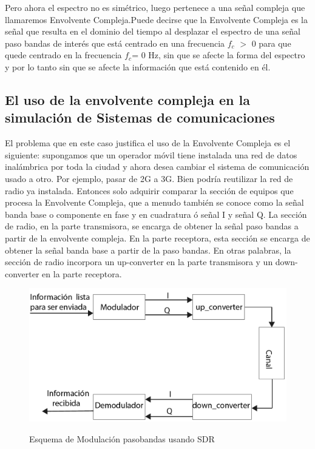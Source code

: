 {\setlength{\parindent}{1pt}Pero ahora el espectro no es simétrico, luego pertenece a una señal compleja que llamaremos Envolvente Compleja.Puede decirse que la Envolvente Compleja es la señal que resulta en el dominio del tiempo al desplazar el espectro de una señal paso bandas de interés que está centrado en una frecuencia $f_{c}$ $>$ 0 para que quede centrado en la frecuencia  $f_{c}$= 0 Hz, sin que se afecte la forma del espectro y por lo tanto sin que se afecte la información que está contenido en él.}\\

\subsection{El uso de la envolvente compleja en la simulación de Sistemas de comunicaciones}

El problema que en este caso justifica el uso de la Envolvente Compleja es el siguiente: supongamos que un operador móvil tiene instalada una red de datos inalámbrica por toda la ciudad y ahora desea cambiar el sistema de comunicación usado a otro. Por ejemplo, pasar de 2G a 3G.  Bien podría reutilizar la red de radio ya instalada. Entonces solo adquirir comparar la sección de equipos que procesa la Envolvente Compleja, que a menudo también se conoce como la señal banda base o componente en fase y en cuadratura ó señal I y señal Q. La sección de radio, en la parte transmisora, se encarga de obtener la señal paso bandas a partir de la envolvente compleja. En la parte receptora, esta sección se encarga de obtener la señal banda base a partir de la paso bandas. En otras palabras, la sección de radio incorpora un up-converter en la parte transmisora y un down-converter en la parte receptora. \\

\vspace{100px}
\begin{figure}[h!]
	\captionsetup{justification = raggedright, singlelinecheck = false}
	\caption{Esquema de Modulación pasobandas usando SDR} 
	\centering
	\includegraphics[scale=0.3]{Imagenes/Envol-GNU.png}
	\label{fig:Envol-GNU}
\end{figure}

